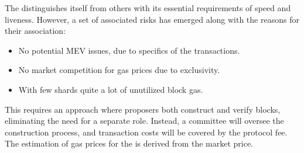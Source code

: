 The \mainshard distinguishes itself from others with its essential requirements of speed and 
liveness. However, a set of associated risks has emerged along with the reasons for their 
association:
\begin{itemize}
    \item No potential MEV issues, due to specifics of the transactions.
    \item No market competition for gas prices due to exclusivity.
    \item With few shards quite a lot of unutilized block gas.
\end{itemize}

This requires an approach where proposers both construct and verify blocks, eliminating the 
need for a separate role. Instead, a committee will oversee the construction process, and 
transaction costs will be covered by the protocol fee. The estimation of gas prices for the 
\mainshard is derived from the market price.